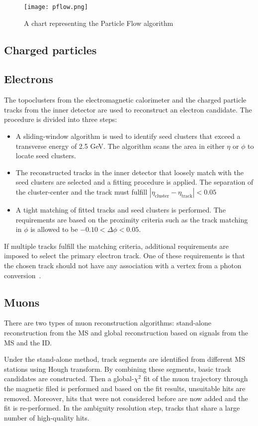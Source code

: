 \begin{figure}[htbp]
    \centering
    \texttt{[image: pflow.png]}
    \caption[Particle flow overview]{A chart representing the Particle Flow algorithm~\cite{Aaboud:2257597}}%
    \label{fig:pflow}
\end{figure}

\subsection{Charged particles}
\subsection*{Electrons}
The topoclusters from the electromagnetic calorimeter and the charged particle tracks from the inner
detector are used to reconstruct an electron candidate. The procedure is divided into three steps:
\begin{itemize}
    \item A sliding-window algorithm is used to identify seed clusters that exceed a transverse
    energy of 2.5 GeV. The algorithm scans the area in either $\eta$ or $\phi$ to locate seed clusters. 
    \item The reconstructed tracks in the inner detector that loosely match with the seed clusters
    are selected and a fitting procedure is applied. The separation of the cluster-center and the 
    track must fulfill $|\eta_{\text{cluster}} - \eta_{\text{track}}|<0.05$
    \item A tight matching of fitted tracks and seed clusters is performed. The requirements are based
    on the proximity criteria such as the track matching in $\phi$ is allowed to be $-0.10< \Delta\phi <0.05$.
\end{itemize}

If multiple tracks fulfill the matching criteria, additional requirements are imposed to select the 
primary electron track. One of these requirements is that the chosen track should not have any association with 
a vertex from a photon conversion~\cite{Aaboud_2019}. 

\subsection*{Muons}
There are two types of muon reconstruction algorithms: stand-alone reconstruction from the MS and global
reconstruction based on signals from the MS and the ID. 

Under the stand-alone method, track segments are identified from different MS stations using Hough transform.
By combining these segments, basic track candidates are constructed. Then a global-$\chi^2$ fit of the 
muon trajectory through the magnetic filed is performed and based on the fit results, unsuitable hits are
removed. Moreover, hits that were not considered before are now added and the fit is re-performed. 
In the ambiguity resolution step, tracks that share a large number of high-quality hits. 

